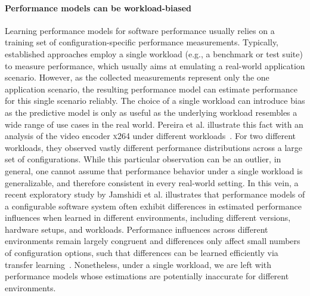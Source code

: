 \paragraph*{Performance models can be workload-biased}
Learning performance models for software performance usually relies on a training set of configuration-specific performance measurements. 
Typically, established approaches employ a single workload (e.g., a benchmark or test suite) to measure performance, which usually aims at emulating a real-world application scenario. 
However, as the collected measurements represent only the one application scenario, the resulting performance model can  estimate performance for this single scenario reliably. 
The choice of a single workload can introduce bias as the predictive model is only as useful as the underlying workload resembles a wide range of use cases in the real world. 
Pereira et al. illustrate this fact with an analysis of the video encoder \textsc{x264} under different workloads~\cite{alves_sampling_2020}. 
For two different workloads, they observed vastly different performance distributions across a large set of configurations.
While this particular observation can be an outlier, in general, one cannot assume that performance behavior under a single workload is generalizable, and therefore consistent in every real-world setting.
In this vein, a recent exploratory study by Jamshidi et al.\cite{jamishidi_transfer_2017} illustrates that performance models of a configurable software system often exhibit differences in estimated performance influences when learned in different environments, including different versions, hardware setups, and workloads.
Performance  influences across different environments remain largely congruent and differences only affect small numbers of configuration options, such that differences can be learned efficiently via transfer learning~\cite{jamshidi_transfer_gp_2017,jamshidi_learning_2018}. 
Nonetheless, under a single workload, we are left with performance models whose estimations are potentially inaccurate for different environments.

